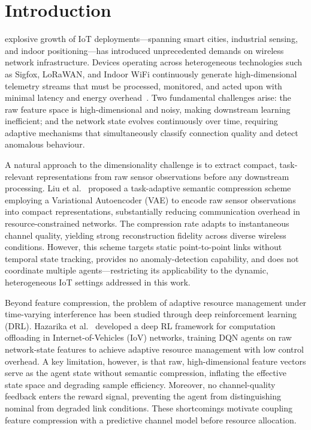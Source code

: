 \section{Introduction}
\label{sec:intro}

 explosive growth of IoT deployments---spanning smart
cities, industrial sensing, and indoor positioning---has introduced
unprecedented demands on wireless network infrastructure. Devices operating
across heterogeneous technologies such as Sigfox, LoRaWAN, and Indoor WiFi
continuously generate high-dimensional telemetry streams that must be
processed, monitored, and acted upon with minimal latency and energy
overhead~\cite{ref_iot_survey}. Two fundamental challenges arise: the raw
feature space is high-dimensional and noisy, making downstream learning
inefficient; and the network state evolves continuously over time, requiring
adaptive mechanisms that simultaneously classify connection quality and detect
anomalous behaviour.

A natural approach to the dimensionality challenge is to extract compact,
task-relevant representations from raw sensor observations before any
downstream processing. Liu et al.~\cite{ref_vae_wireless} proposed a
task-adaptive semantic compression scheme employing a Variational Autoencoder
(VAE) to encode raw sensor observations into compact representations,
substantially reducing communication overhead in resource-constrained
networks. The compression rate adapts to instantaneous channel quality,
yielding strong reconstruction fidelity across diverse wireless conditions.
However, this scheme targets static point-to-point links without temporal
state tracking, provides no anomaly-detection capability, and does not
coordinate multiple agents---restricting its applicability to the dynamic,
heterogeneous IoT settings addressed in this work.

Beyond feature compression, the problem of adaptive resource management under
time-varying interference has been studied through deep reinforcement learning
(DRL). Hazarika et al.~\cite{ref_marl_wireless} developed a deep RL framework
for computation offloading in Internet-of-Vehicles (IoV) networks, training
DQN agents on raw network-state features to achieve adaptive resource
management with low control overhead. A key limitation, however, is that
raw, high-dimensional feature vectors serve as the agent state without
semantic compression, inflating the effective state space and degrading
sample efficiency. Moreover, no channel-quality feedback enters the reward
signal, preventing the agent from distinguishing nominal from degraded link
conditions. These shortcomings motivate coupling feature compression with a
predictive channel model before resource allocation.


